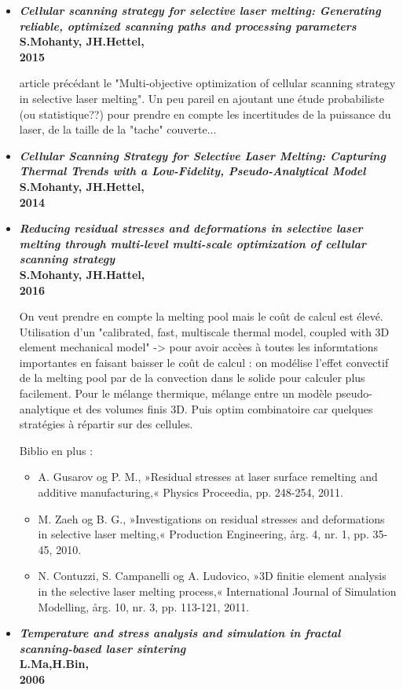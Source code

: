 \documentclass[11pt,a4paper]{article}
\begin{document}
\begin{itemize}
	\item \textbf{\emph{Cellular scanning strategy for selective laser melting: Generating reliable, optimized scanning paths and processing parameters} \\
		S.Mohanty, JH.Hettel, \\
		2015}
	
	\vspace{0cm}
	
	article précédant le "Multi-objective optimization of cellular scanning strategy in selective laser melting". Un peu pareil en ajoutant une étude probabiliste (ou statistique??) pour prendre en compte les incertitudes de la puissance du laser, de la taille de la "tache" couverte...
	
	
	\item \textbf{\emph{Cellular Scanning Strategy for Selective Laser Melting: Capturing
			Thermal Trends with a Low-Fidelity, Pseudo-Analytical Model} \\
		S.Mohanty, JH.Hettel, \\
		2014}
	
	\item \textbf{\emph{Reducing residual stresses and deformations in selective laser melting through multi-level multi-scale optimization of cellular scanning strategy} \\
		S.Mohanty, JH.Hattel, \\
		2016}
	
	\vspace{0cm}
	
	On veut prendre en compte la melting pool mais le coût de calcul est élevé. 
	Utilisation d'un "calibrated, fast, multiscale thermal model, coupled with 3D element mechanical model" -> pour avoir accèes à toutes les informtations importantes en faisant baisser le coût de calcul : on modélise l'effet convectif de la melting pool par de la convection dans le solide pour calculer plus facilement. Pour le mélange thermique, mélange entre un modèle pseudo-analytique et des volumes finis 3D. Puis optim combinatoire car quelques stratégies à répartir sur des cellules.
	
	\vspace{0cm}
	
	Biblio en plus :
	\begin{itemize}
		\item A. Gusarov og P. M., »Residual stresses at laser surface remelting and additive manufacturing,« Physics Proceedia, pp. 248-254, 2011.
		\item M. Zaeh og B. G., »Investigations on residual stresses and deformations in selective laser melting,« Production Engineering, årg. 4, nr. 1, pp. 35-45, 2010.
		\item N. Contuzzi, S. Campanelli og A. Ludovico, »3D finitie element analysis in the selective laser melting process,« International Journal of Simulation Modelling, årg. 10, nr. 3, pp. 113-121, 2011.
	\end{itemize}
	\item \textbf{\emph{Temperature and stress analysis and simulation in fractal scanning-based laser sintering} \\
		L.Ma,H.Bin, \\
		2006}
	

\end{itemize}
\end{document}
